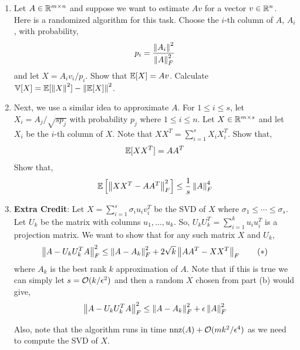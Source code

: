 \documentclass[10pt]{article}
\begin{document}
\begin{problem}[Problem 4]
\begin{enumerate}[label=(\alph*),nolistsep]
    \item Let \( A\in\mathbb{R}^{m\times n} \) and suppose we want to estimate \( Av \) for a vector \( v \in \mathbb{R}^n \). Here is a randomized algorithm for this task. Choose the \( i \)-th column of \( A \), \( A_i \), with probability,
        \begin{align*}
            p_i = \frac{\left\lVert A_i\right\rVert^2}{\left\lVert A\right\rVert_F^2}
        \end{align*}
        and let \( X = A_iv_i/p_i \). Show that \( \mathbb{E}[X] = Av \). Calculate \( \mathbb{V}[X] = \mathbb{E}[\left\lVert X\right\rVert^2]-\left\lVert\mathbb{E}[X]\right\rVert^2 \).
    \item Next, we use a similar idea to approximate \( A \). For \( 1\leq i\leq s \), let \( X_i = A_j / \sqrt{sp_j} \) with probability \( p_j \) where \( 1\leq i\leq n \). Let \( X \in\mathbb{R}^{m\times s} \) and let \( X_i \) be the \( i \)-th column of \( X \). Note that \( XX^T = \sum_{i=1}^{s}X_iX_i^T \). Show that,
        \begin{align*}
            \mathbb{E} [XX^T] = AA^T
        \end{align*}
        Show that, 
        \begin{align*}
            \mathbb{E} \left[ \left\lVert XX^T-AA^T\right\rVert_F^2 \right] \leq \frac{1}{s} \left\lVert A\right\rVert_F^4 
        \end{align*}
    \item \textbf{Extra Credit}: Let \( X = \sum_{i=1}^{s}\sigma_i u_iv_i^T \) be the SVD of \( X \) where \( \sigma_1 \leq \cdots \leq \sigma_s \). Let \( U_k \) be the matrix with columns \( u_1,\ldots, u_k \). So, \( U_kU_k^T = \sum_{i=1}^{k}u_iu_i^T \) is a projection matrix. We want to show that for any such matrix \( X \) and \( U_k \),
        \begin{align*}
            \left\lVert A-U_kU_k^TA\right\rVert_F^2 \leq \left\lVert A-A_k\right\rVert_F^2 + 2\sqrt{k} \left\lVert AA^T-XX^T\right\rVert_F \tag{\(*\)}
        \end{align*}
        where \( A_k \) is the best rank \( k \) approximation of \( A \). Note that if this is true we can simply let \( s = \mathcal{O}(k/\epsilon^2) \) and then a random \( X \) chosen from part (b) would give,
        \begin{align*}
            \left\lVert A-U_kU_k^TA\right\rVert_F^2\leq \left\lVert A-A_k\right\rVert_F^2 + \epsilon\left\lVert A\right\rVert_F^2
        \end{align*}
        
        Also, note that the algorithm runs in time \( \operatorname{nnz}(A) + \mathcal{O}(mk^2/\epsilon^4) \) as we need to compute the SVD of \( X \).
        

\end{enumerate}
\end{problem}
\end{document}
